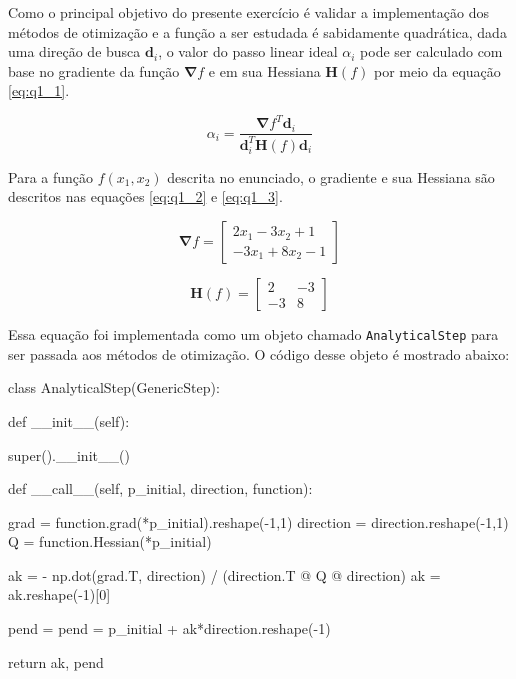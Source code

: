 \documentclass[10pt, a4paper]{article}
\begin{document}
Como o principal objetivo do presente exercício é validar a implementação dos métodos de otimização e a função a ser estudada é sabidamente quadrática, dada uma direção de busca $\mathbf{d}_i$,
o valor do passo linear ideal $\alpha_i$ pode ser calculado com base no gradiente da função $\mathbf{\nabla}f$ e em sua Hessiana $\mathbf{H}(f)$ por meio da equação
\ref{eq:q1_1}.

\begin{equation}\label{eq:q1_1}
  \alpha_i = \frac{\mathbf{\nabla}f^T \mathbf{d}_i}{\mathbf{d}_i^T \mathbf{H}(f) \mathbf{d}_i}
\end{equation}

Para a função $f(x_1, x_2)$ descrita no enunciado, o gradiente e sua Hessiana são descritos nas equações \ref{eq:q1_2} e \ref{eq:q1_3}.

\begin{equation}\label{eq:q1_2}
  \mathbf{\nabla}f = \begin{bmatrix} 2x_1 - 3x_2 + 1\\-3x_1 + 8x_2 - 1 \end{bmatrix}
\end{equation}

\begin{equation}\label{eq:q1_3}
  \mathbf{H}(f) = \begin{bmatrix} 2 &-3 \\ -3 & 8 \end{bmatrix}
\end{equation}

Essa equação foi implementada como um objeto chamado {\tt AnalyticalStep} para ser passada aos métodos de otimização. O código desse objeto é mostrado abaixo:

\begin{python}
class AnalyticalStep(GenericStep):

  def __init__(self):

    super().__init__()

  def __call__(self, p_initial, direction, function):
    

    grad = function.grad(*p_initial).reshape(-1,1)
    direction = direction.reshape(-1,1)
    Q = function.Hessian(*p_initial)

    ak = - np.dot(grad.T, direction) / (direction.T @ Q @ direction)
    ak =  ak.reshape(-1)[0]

    pend = pend = p_initial + ak*direction.reshape(-1)

    return ak, pend
\end{python}
\end{document}
